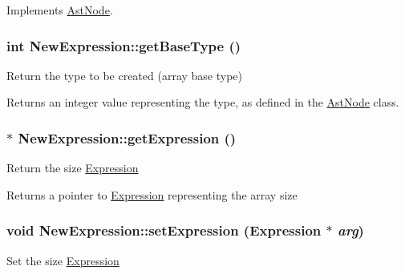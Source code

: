 Implements \hyperlink{classAstNode_a67b2d6ce1262da2954fb4db255759fb3}{AstNode}.\hypertarget{classNewExpression_aa26ede4c3685e4cf1846eb62b9051355}{
\subsubsection[{getBaseType}]{\setlength{\rightskip}{0pt plus 5cm}int NewExpression::getBaseType ()}}
\label{classNewExpression_aa26ede4c3685e4cf1846eb62b9051355}
Return the type to be created (array base type)

\begin{DoxyReturn}{Returns}
an integer value representing the type, as defined in the \hyperlink{classAstNode}{AstNode} class. 
\end{DoxyReturn}
\hypertarget{classNewExpression_a86da8a128d8c401ba775cd997aa634fa}{
\subsubsection[{getExpression}]{$\ast$ NewExpression::getExpression ()}}
\label{classNewExpression_a86da8a128d8c401ba775cd997aa634fa}
Return the size \hyperlink{classExpression}{Expression}

\begin{DoxyReturn}{Returns}
a pointer to \hyperlink{classExpression}{Expression} representing the array size 
\end{DoxyReturn}
\hypertarget{classNewExpression_a187b0a20b76ebd542c84b43880ef9692}{
\subsubsection[{setExpression}]{\setlength{\rightskip}{0pt plus 5cm}void NewExpression::setExpression ({\bf Expression} $\ast$ {\em arg})}}
\label{classNewExpression_a187b0a20b76ebd542c84b43880ef9692}
Set the size \hyperlink{classExpression}{Expression}


